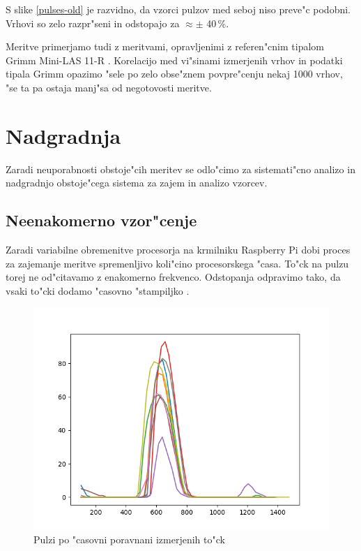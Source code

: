 \documentclass[11pt,a4paper]{article}
\begin{document}
S slike \ref{pulses-old} je razvidno, da vzorci pulzov med seboj niso preve"c podobni. Vrhovi so zelo razpr"seni in odstopajo za $ \approx \pm $ 40\,\%.

Meritve primerjamo tudi z meritvami, opravljenimi z referen"cnim tipalom Grimm Mini-LAS 11-R \cite{grimm-min-las}. Korelacijo med vi"sinami izmerjenih vrhov in podatki tipala Grimm opazimo "sele po zelo obse"znem povpre"cenju nekaj 1000 vrhov, "se ta pa ostaja manj"sa od negotovosti meritve.

\clearpage

\section{Nadgradnja}
Zaradi neuporabnosti obstoje"cih meritev se odlo"cimo za sistemati"cno analizo in nadgradnjo obstoje"cega sistema za zajem in analizo vzorcev.

\subsection{Neenakomerno vzor"cenje}
Zaradi variabilne obremenitve procesorja na krmilniku Raspberry Pi dobi proces za zajemanje meritve spremenljivo koli"cino procesorskega "casa. To"ck na pulzu torej ne od"citavamo z enakomerno frekvenco. Odstopanja odpravimo tako, da vsaki to"cki dodamo "casovno "stampiljko .

\begin{figure}[H]
	\begin{center}
		\includegraphics[width=12cm]{aligned.png}
		\caption{Pulzi po "casovni poravnani izmerjenih to"ck}
		\label{aligned}
	\end{center}
\end{figure}
\end{document}
